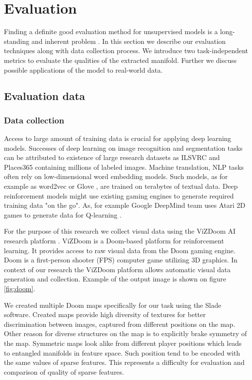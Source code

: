 
\chapter{Evaluation}
\label{ch:eval}

Finding a definite good evaluation method for unsupervised models is a long-standing and inherent problem \cite{Li2015}. In this section we describe our evaluation techniques along with data collection process. We introduce two task-independent metrics to evaluate the qualities of the extracted manifold. Further we discuss possible applications of the model to real-world data.


\section{Evaluation data}
\subsection{Data collection}

Access to large amount of training data is crucial for applying deep learning models.
Successes of deep learning on image recognition and segmentation tasks can be attributed to existence of large research datasets as ILSVRC and Places365 \cite{ILSVRC15, Zhou2016} containing millions of labeled images.
Machine translation, NLP tasks \cite{Karpathy2014, Kim2014} often rely on low-dimensional word embedding models.
Such models, as for example as word2vec or Glove \cite{Mikolov2013, pennington2014glove}, are trained on terabytes of textual data.
Deep reinforcement models might use existing gaming engines to generate required training data "on the go".
As, for example Google DeepMind team uses Atari 2D games to generate data for Q-learning \cite{Mnih2013}.

For the purpose of this research we collect visual data using the ViZDoom AI research platform \cite{Kempka2016}.
ViZDoom is a Doom-based platform for reinforcement learning.
It provides access to raw visual data from the Doom gaming engine.
Doom is a first-person shooter (FPS) computer game utilizing 3D graphics.
In context of our research the ViZDoom platform allows automatic visual data generation and collection.
Example of the output image is shown on figure \ref{fig:doom}.

We created multiple Doom maps specifically for our task using the Slade \cite{Slade3} software.
Created maps provide high diversity of textures for better discrimination between images, captured from different positions on the map.
Other reason for diverse structures on the map is to explicitly brake symmetry of the map.
Symmetric maps look alike from different player positions which leads to entangled manifolds in feature space.
Such position tend to be encoded with the same values of sparse features.
This represents a difficulty for evaluation and comparison of quality of sparse features.

